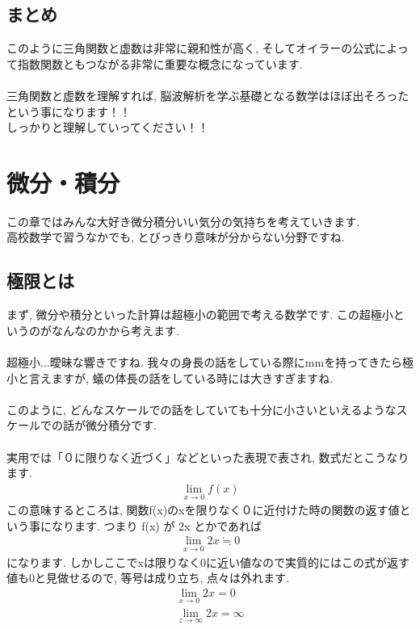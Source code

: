 \documentclass[11pt,a4paper]{jreport}
\begin{document}
\section{まとめ}
このように三角関数と虚数は非常に親和性が高く, そしてオイラーの公式によって指数関数ともつながる非常に重要な概念になっています. \\
\\
三角関数と虚数を理解すれば, 脳波解析を学ぶ基礎となる数学はほぼ出そろったという事になります！！\\
しっかりと理解していってください！！\\

\chapter{微分・積分}
この章ではみんな大好き微分積分いい気分の気持ちを考えていきます.\\
高校数学で習うなかでも, とびっきり意味が分からない分野ですね.\\
\section{極限とは}
まず, 微分や積分といった計算は超極小の範囲で考える数学です. この超極小というのがなんなのかから考えます.\\
\\
超極小...曖昧な響きですね. 我々の身長の話をしている際にmmを持ってきたら極小と言えますが, 蟻の体長の話をしている時には大きすぎますね. \\
\\
このように, どんなスケールでの話をしていても十分に小さいといえるようなスケールでの話が微分積分です.\\
\\
実用では「０に限りなく近づく」などといった表現で表され, 数式だとこうなります.
\begin{eqnarray}
\lim_{x\to0} f(x)
\end{eqnarray}
この意味するところは, 関数f(x)のxを限りなく０に近付けた時の関数の返す値という事になります. つまり f(x) が 2x とかであれば
\begin{eqnarray}
\lim_{x\to0} 2x ≒ 0
\end{eqnarray}
になります. しかしここでxは限りなく0に近い値なので実質的にはこの式が返す値も0と見做せるので, 等号は成り立ち, 点々は外れます.
\begin{eqnarray}
\lim_{x\to0} 2x = 0\\
\lim_{z\to\infty} 2x = \infty
\end{eqnarray}
\end{document}
